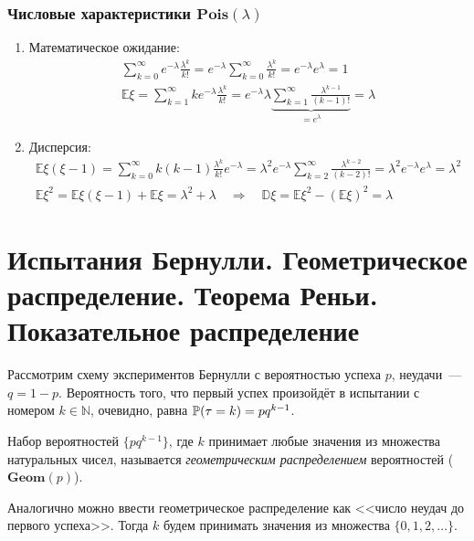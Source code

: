 \subsubsection{Числовые характеристики $\mathbf{Pois}(\lambda)$}
\begin{enumerate}
    \item Математическое ожидание:
    \begin{align*}
        \sum\limits_{k=0}^{\infty} e^{-\lambda} \frac{\lambda^k}{k!} = e^{-\lambda} \sum\limits_{k=0}^{\infty} \frac{\lambda^k}{k!} = e^{-\lambda} e^\lambda = 1 \\
        \mathbb{E}\xi = \sum\limits_{k=1}^{\infty} k e^{-\lambda} \frac{\lambda^k}{k!} = e^{-\lambda} \lambda \underbrace{\sum\limits_{k=1}^{\infty} \frac{\lambda^{k-1}}{(k - 1)!}}_{= e^\lambda} = \lambda
    \end{align*}
    \item Дисперсия:
    \begin{align*}
        \mathbb{E}\xi(\xi - 1) = \sum\limits_{k=0}^{\infty} k (k - 1) \frac{\lambda^k}{k!} e^{-\lambda}  = \lambda^2 e^{-\lambda} \sum\limits_{k=2}^{\infty} \frac{\lambda^{k-2}}{(k-2)!} = \lambda^2 e^{-\lambda} e^\lambda = \lambda^2 \\
        \mathbb{E}\xi^2 = \mathbb{E}\xi(\xi - 1) + \mathbb{E}\xi = \lambda^2 + \lambda \quad \Rightarrow \quad \mathbb{D}\xi = \mathbb{E}\xi^2 - (\mathbb{E}\xi)^2 = \lambda
    \end{align*}
\end{enumerate}

\section{Испытания Бернулли. Геометрическое распределение. Теорема Реньи. Показательное распределение}
Рассмотрим схему экспериментов Бернулли с вероятностью успеха $p$, неудачи~--- $q = 1 - p$. Вероятность того, что первый успех произойдёт в испытании с номером $k \in \mathbb{N}$, очевидно, равна ${\mathbb{P}(\tau = k)} = pq^{k-1}$.

\begin{defn}
    Набор вероятностей $\{p q^{k-1}\}$, где $k$ принимает любые значения из множества натуральных чисел, называется {\it геометрическим распределением} вероятностей ($\mathbf{Geom}(p)$).
\end{defn}

Аналогично можно ввести геометрическое распределение как <<число неудач до первого успеха>>. Тогда $k$ будем принимать значения из множества $\{0, 1, 2, \ldots\}$.

